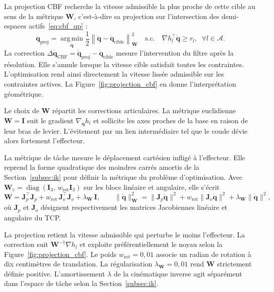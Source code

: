   La projection \ac{CBF} recherche la vitesse admissible la plus proche de cette cible au sens de la métrique $\mathbf{W}$,
  c'est-à-dire sa projection sur l'intersection des demi-espaces actifs~\eqref{eq:cbf_qp} :
  \begin{equation}
  \dot{\mathbf{q}}_{\mathrm{proj}}
  =
  \operatorname*{arg\,min}_{\dot{\mathbf{q}}}
  \frac{1}{2}
  \left\|
  \dot{\mathbf{q}}
  -
  \dot{\mathbf{q}}_{\mathrm{cible}}
  \right\|_{\mathbf{W}}^2
  \quad
  \text{s.c.}
  \quad
  \nabla h_l^\top\dot{\mathbf{q}}
  \geq
  r_l,
  \;\;
  \forall l \in \mathcal{A}.
  \end{equation}
  La correction $\Delta\dot{\mathbf{q}}_{\mathrm{CBF}} = \dot{\mathbf{q}}_{\mathrm{proj}}-\dot{\mathbf{q}}_{\mathrm{cible}}$ mesure l'intervention du filtre après la résolution. Elle s'annule lorsque la vitesse cible satisfait toutes les contraintes. L'optimisation rend ainsi directement la vitesse lissée admissible sur les contraintes actives. La Figure~\ref{fig:projection_cbf} en donne l'interprétation géométrique.


  Le choix de $\mathbf{W}$ répartit les corrections articulaires. La métrique euclidienne $\mathbf{W}=\mathbf{I}$ suit le gradient $\nabla_{\mathbf{q}} h_l$ et sollicite les axes proches de la base en raison de leur bras de levier. L'évitement par un lien intermédiaire tel que le coude dévie alors fortement l'effecteur.

  La métrique de tâche mesure le déplacement cartésien infligé à l'effecteur. Elle reprend la forme quadratique des moindres carrés amortis de la Section~\ref{subsec:ik} pour définir la métrique du problème d'optimisation. Avec $\mathbf{W}_e = \operatorname{diag}(\mathbf{I}_3,\, w_{\mathrm{rot}}\mathbf{I}_3)$ sur les blocs linéaire et angulaire, elle s'écrit
  \begin{equation}
  \mathbf{W} = \mathbf{J}_p^{\top}\mathbf{J}_p + w_{\mathrm{rot}}\,\mathbf{J}_o^{\top}\mathbf{J}_o + \lambda_{\mathbf{W}}\,\mathbf{I},
  \qquad
  \|\dot{\mathbf{q}}\|_{\mathbf{W}}^2 = \|\mathbf{J}_p\dot{\mathbf{q}}\|^2 + w_{\mathrm{rot}}\|\mathbf{J}_o\dot{\mathbf{q}}\|^2 + \lambda_{\mathbf{W}}\|\dot{\mathbf{q}}\|^2,
  \end{equation}
  où $\mathbf{J}_p$ et $\mathbf{J}_o$ désignent respectivement les matrices Jacobiennes linéaire et angulaire du \ac{TCP}.

  La projection retient la vitesse admissible qui perturbe le moins l'effecteur. La correction suit $\mathbf{W}^{-1}\nabla h_l$ et exploite préférentiellement le noyau selon la Figure~\ref{fig:projection_cbf}. Le poids $w_{\mathrm{rot}}=0{,}01$ associe un radian de rotation à dix centimètres de translation. La régularisation $\lambda_{\mathbf{W}}=0{,}01$ rend $\mathbf{W}$ strictement définie positive. L'amortissement $\lambda$ de la cinématique inverse agit séparément dans l'espace de tâche selon la Section~\ref{subsec:ik}.

